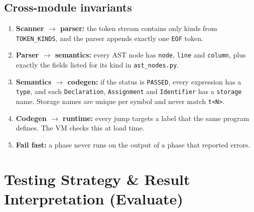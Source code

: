 \documentclass[11pt,letterpaper]{article}
\newcommand{\code}[1]{\texttt{#1}}
\begin{document}
\subsection{Cross-module invariants}
\begin{enumerate}
  \item \textbf{Scanner $\rightarrow$ parser:} the token stream contains only kinds from \code{TOKEN\_KINDS}, and the parser appends exactly one \code{EOF} token.
  \item \textbf{Parser $\rightarrow$ semantics:} every AST node has \code{node}, \code{line} and \code{column}, plus exactly the fields listed for its kind in \code{ast\_nodes.py}.
  \item \textbf{Semantics $\rightarrow$ codegen:} if the status is \code{PASSED}, every expression has a \code{type}, and each \code{Declaration}, \code{Assignment} and \code{Identifier} has a \code{storage} name. Storage names are unique per symbol and never match \code{t<N>}.
  \item \textbf{Codegen $\rightarrow$ runtime:} every jump targets a label that the same program defines. The VM checks this at load time.
  \item \textbf{Fail fast:} a phase never runs on the output of a phase that reported errors.
\end{enumerate}

\section{Testing Strategy \& Result Interpretation \textmd{(Evaluate)}}
\end{document}
